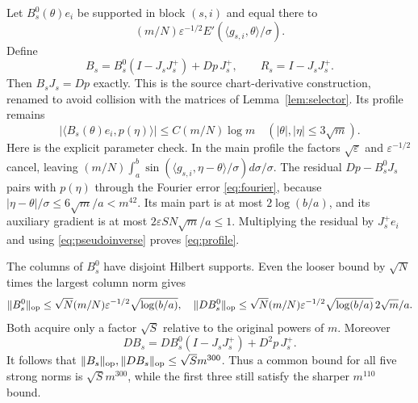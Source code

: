 \documentclass[11pt]{article}
\theoremstyle{remark}\newtheorem{remark}[theorem]{Remark}
\numberwithin{equation}{section}
\newcommand{\ip}[2]{\langle #1,#2\rangle}
\newcommand{\norm}[1]{\lVert #1\rVert}
\begin{document}
Let $B_s^0(\theta)e_i$ be supported in block $(s,i)$ and equal there to
\[
 (m/N)\varepsilon^{-1/2}E'(\ip{g_{s,i}}\theta/\sigma).
\]
Define
\begin{equation}\label{eq:B}
 B_s=B_s^0(I-J_sJ_s^+)+Dp\,J_s^+,
 \qquad R_s=I-J_sJ_s^+.
\end{equation}
Then $B_sJ_s=Dp$ exactly. This is the source chart-derivative construction,
renamed to avoid collision with the matrices of Lemma~\ref{lem:selector}.
Its profile remains
\begin{equation}\label{eq:profile}
 |\ip{B_s(\theta)e_i}{p(\eta)}|\le C(m/N)\log m
 \quad (|\theta|,|\eta|\le3\sqrt m).
\end{equation}
Here is the explicit parameter check. In the main profile the factors
$\sqrt\varepsilon$ and $\varepsilon^{-1/2}$ cancel, leaving
$(m/N)\int_a^b\sin(\ip{g_{s,i}}{\eta-\theta}/\sigma)d\sigma/\sigma$.
The residual $Dp-B_s^0J_s$ pairs with $p(\eta)$ through the Fourier
error \eqref{eq:fourier}, because $|\eta-\theta|/\sigma\le6\sqrt m/a<m^{42}$.
Its main part is at most $2\log(b/a)$, and its auxiliary gradient is at most
$2\varepsilon SN\sqrt m/a\le1$. Multiplying the residual by $J_s^+e_i$
and using \eqref{eq:pseudoinverse} proves \eqref{eq:profile}.

The columns of $B_s^0$ have disjoint Hilbert supports. Even the looser
bound by $\sqrt N$ times the largest column norm gives
\[
 \norm{B_s^0}_{\op}\le\sqrt N(m/N)\varepsilon^{-1/2}\sqrt{\log(b/a)},
 \quad
 \norm{DB_s^0}_{\op}\le\sqrt N(m/N)\varepsilon^{-1/2}
          \sqrt{\log(b/a)}\,2\sqrt m/a.
\]
Both acquire only a factor $\sqrt S$ relative to the original powers of
$m$. Moreover
\[
 DB_s=DB_s^0(I-J_sJ_s^+)+D^2p\,J_s^+.
\]
It follows that $\norm{B_s}_{\op},\norm{DB_s}_{\op}\le\sqrt S m^{300}$.
Thus a common bound for all five strong norms is $\sqrt S m^{300}$,
while the first three still satisfy the sharper $m^{110}$ bound.
\end{document}
